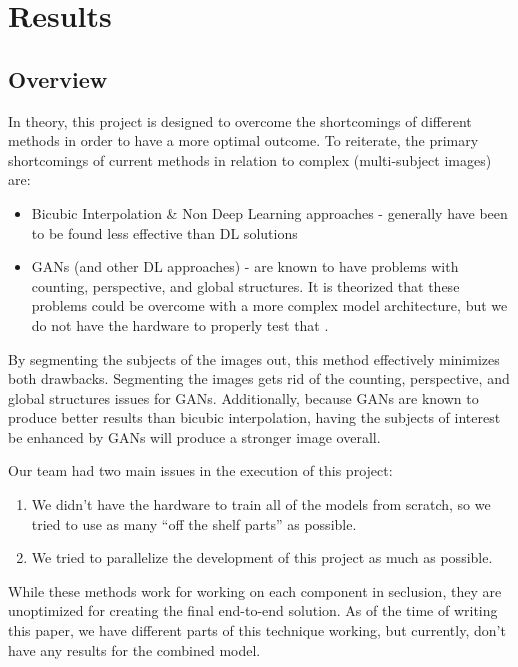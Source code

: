 \section{Results}
\subsection{Overview}
In theory, this project is designed to overcome the shortcomings of different
methods in order to have a more optimal outcome. To reiterate, the primary
shortcomings of current methods in relation to complex (multi-subject images)
are:

\begin{itemize}
	\item Bicubic Interpolation \& Non Deep Learning approaches - generally have
been to be found less effective than DL solutions
	\item GANs (and other DL approaches) - are known to have problems with
counting, perspective, and global structures. It is theorized that these
problems could be overcome with a more complex model architecture, but we do not
have the hardware to properly test that \cite{Goodfellow2017}.
\end{itemize}

By segmenting the subjects of the images out, this method effectively minimizes both drawbacks. Segmenting the images gets rid of the counting, perspective, and global structures issues for GANs. Additionally, because GANs are known to produce better results than bicubic interpolation, having the subjects of interest be enhanced by GANs will produce a stronger image overall.

Our team had two main issues in the execution of this project:

\begin{enumerate}
	\item We didn’t have the hardware to train all of the models from scratch, so
we tried to use as many “off the shelf parts” as possible.
	\item We tried to parallelize the development of this project as much as possible. 
\end{enumerate}

While these methods work for working on each component in seclusion, they are
unoptimized for creating the final end-to-end solution. As of the time of
writing this paper, we have different parts of this technique working, but
currently, don’t have any results for the combined model. \\

